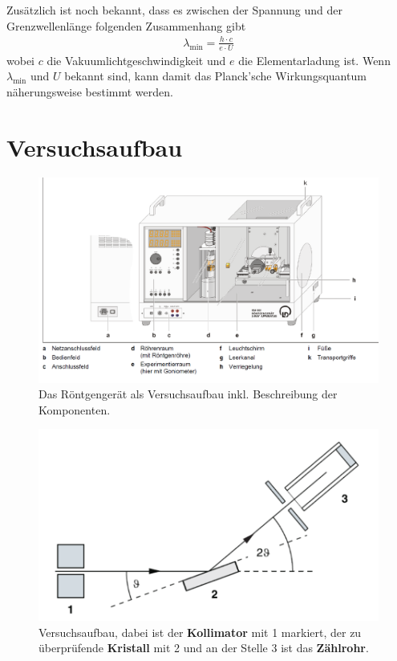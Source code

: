 \documentclass{article}
\begin{document}
Zusätzlich ist noch bekannt, dass es zwischen der Spannung und der Grenzwellenlänge folgenden Zusammenhang gibt
\begin{align}
\lambda_{\min} = \frac{h\cdot c}{e\cdot U}\label{eq:planck_formel}
\end{align}
wobei $c$ die Vakuumlichtgeschwindigkeit und $e$ die Elementarladung ist. Wenn $\lambda_{\min}$ und $U$ bekannt sind, kann damit das Planck'sche Wirkungsquantum näherungsweise bestimmt werden.




\section{Versuchsaufbau}


\begin{figure}[H]
\includegraphics[scale=1]{aufbau.png}
\caption{Das Röntgengerät als Versuchsaufbau inkl. Beschreibung der Komponenten.}
\end{figure}


\begin{figure}[H]
\includegraphics[scale=1]{versuch1.png}
\caption{Versuchsaufbau, dabei ist der \textbf{Kollimator} mit 1 markiert, der zu überprüfende \textbf{Kristall} mit 2 und an der Stelle 3 ist das \textbf{Zählrohr}.}
\end{figure}
\end{document}
